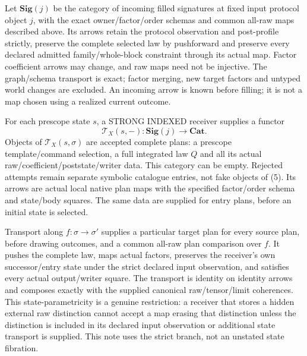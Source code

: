 \documentclass[11pt]{article}\usepackage{amsmath,amssymb,amsthm,geometry}\geometry{margin=1in}
\begin{document}
Let $\mathbf{Sig}(j)$ be the category of incoming filled signatures at fixed input protocol object $j$, with the exact owner/factor/order schemas and common all-raw maps described above. Its arrows retain the protocol observation and post-profile strictly, preserve the complete selected law by pushforward and preserve every declared admitted family/whole-block constraint through its actual map. Factor coefficient arrows may change, and raw maps need not be injective. The graph/schema transport is exact; factor merging, new target factors and untyped world changes are excluded. An incoming arrow is known before filling; it is not a map chosen using a realized current outcome.

For each prescope state $s$, a STRONG INDEXED receiver supplies a functor
\[
 \mathcal T_X(s,-):\mathbf{Sig}(j)\longrightarrow\mathbf{Cat}.        \tag{5}
\]
Objects of $\mathcal T_X(s,\sigma)$ are accepted complete plans: a prescope template/command selection, a full integrated law $Q$ and all its actual raw/coefficient/poststate/writer data. This category can be empty. Rejected attempts remain separate symbolic catalogue entries, not fake objects of (5). Its arrows are actual local native plan maps with the specified factor/order schema and state/body squares. The same data are supplied for entry plans, before an initial state is selected.

Transport along $f:\sigma\to\sigma'$ supplies a particular target plan for every source plan, before drawing outcomes, and a common all-raw plan comparison over $f$. It pushes the complete law, maps actual factors, preserves the receiver's own successor/entry state under the strict declared input observation, and satisfies every actual output/writer square. The transport is identity on identity arrows and composes exactly with the supplied canonical raw/tensor/limit coherences. This state-parametricity is a genuine restriction: a receiver that stores a hidden external raw distinction cannot accept a map erasing that distinction unless the distinction is included in its declared input observation or additional state transport is supplied. This note uses the strict branch, not an unstated state fibration.
\end{document}
